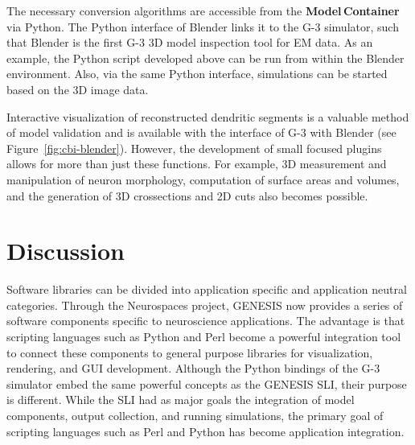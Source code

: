 \documentclass[12pt]{article}
\begin{document}
The necessary conversion algorithms are accessible from the
{\bf Model\,Container} via Python.  The Python interface of Blender links it to the G-3
simulator, such that Blender is the first G-3 3D model inspection
tool for EM data.  As an example, the Python script developed above
can be run from within the Blender environment.  Also, via the same
Python interface, simulations can be started based on the 3D image
data.

Interactive visualization of reconstructed dendritic segments is a
valuable method of model validation and is available with the
interface of G-3 with Blender (see Figure~\ref{fig:cbi-blender}).
However, the development of small focused plugins allows for more than
just these functions. For example, 3D measurement and manipulation of
neuron morphology, computation of surface areas and volumes, and the
generation of 3D crossections and 2D cuts also becomes possible.

\section{Discussion}

Software libraries can be divided into application specific and
application neutral categories.  Through the Neurospaces project,
GENESIS now provides a series of software components specific to
neuroscience applications.  The advantage is that scripting languages
such as Python and Perl become a powerful integration tool to connect
these components to general purpose libraries for visualization,
rendering, and GUI development.  Although the Python bindings of the G-3
simulator embed the same powerful concepts as the GENESIS SLI, their
purpose is different.  While the SLI had as major goals the
integration of model components, output collection, and running
simulations, the primary goal of scripting languages such as Perl and
Python has become application integration.
\end{document}
